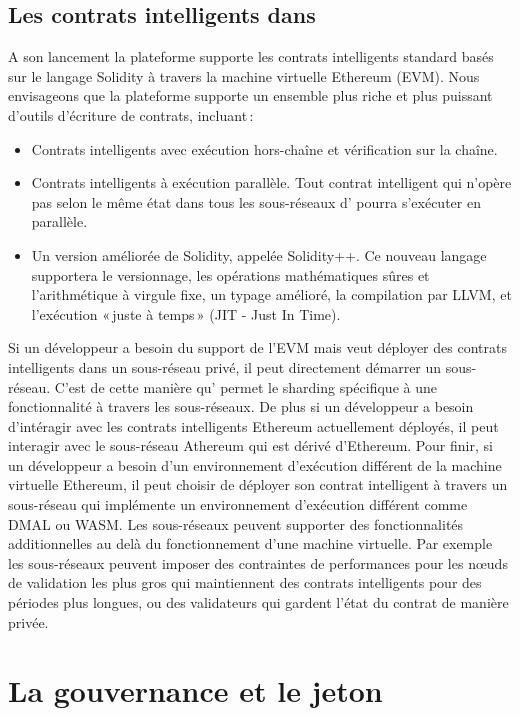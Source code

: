 \documentclass[runningheads,francais,a4paper]{llncs}
\begin{document}
\subsection{Les contrats intelligents dans \AVATokenName}
A son lancement la plateforme \AVAPlatformName{} supporte les contrats intelligents standard basés sur le langage
Solidity à travers la machine virtuelle Ethereum (EVM). Nous envisageons que la plateforme supporte un ensemble plus
riche et plus puissant d'outils d'écriture de contrats, incluant\,:
\begin{itemize}
\item Contrats intelligents avec exécution hors-chaîne et vérification sur la chaîne.
\item Contrats intelligents à exécution parallèle. Tout contrat intelligent qui n'opère pas selon le même état dans tous
les sous-réseaux d'\AVAPlatformName{} pourra s'exécuter en parallèle.
\item Un version améliorée de Solidity, appelée Solidity++. Ce nouveau langage supportera le versionnage, les opérations
mathématiques sûres et l'arithmétique à virgule fixe, un typage amélioré, la compilation par LLVM, et l'exécution
«\,juste à temps\,» (JIT - Just In Time).
\end{itemize}

Si un développeur a besoin du support de l'EVM mais veut déployer des contrats intelligents dans un sous-réseau privé,
il peut directement démarrer un sous-réseau. C'est de cette manière qu'\AVAPlatformName{} permet le sharding spécifique
à une fonctionnalité à travers les sous-réseaux. De plus si un développeur a besoin d'intéragir avec les contrats
intelligents Ethereum actuellement déployés, il peut interagir avec le sous-réseau Athereum qui est dérivé d'Ethereum.
Pour finir, si un développeur a besoin d'un environnement d'exécution différent de la machine virtuelle Ethereum, il peut
choisir de déployer son contrat intelligent à travers un sous-réseau qui implémente un environnement d'exécution
différent comme DMAL ou WASM. Les sous-réseaux peuvent supporter des fonctionnalités additionnelles au delà du
fonctionnement d'une machine virtuelle. Par exemple les sous-réseaux peuvent imposer des contraintes de performances
pour les nœuds de validation les plus gros qui maintiennent des contrats intelligents pour des périodes plus longues,
ou des validateurs qui gardent l'état du contrat de manière privée.

\section{La gouvernance et le jeton \AVATokenName{}}
\label{section:governance_and_token}
\end{document}
